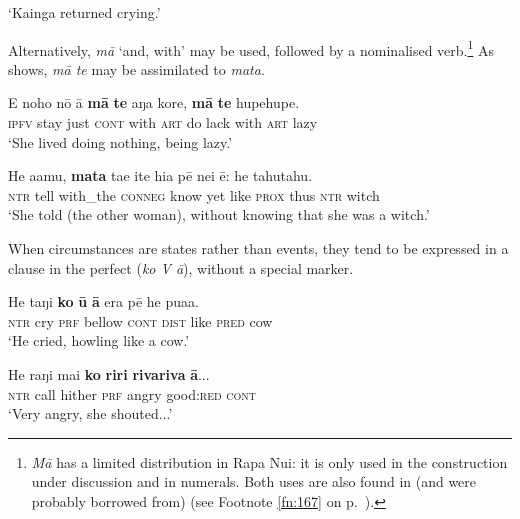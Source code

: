\glt
‘Kainga returned crying.’ \textstyleExampleref{[R243.173]} 
\z

Alternatively, \textit{mā} ‘and, with’ may be used, followed by a nominalised verb.\footnote{\label{fn:538}\textit{Mā} has a limited distribution in Rapa Nui: it is only used in the construction under discussion and in numerals. Both uses are also found in (and were probably borrowed from)  (see Footnote \ref{fn:167} on p.~\pageref{fn:167}).} As  shows, \textit{mā te} may be assimilated to \textit{mata}.

\ea\label{ex:11.272}
\gll E noho nō {\ꞌ}ā \textbf{mā} \textbf{te} aŋa kore, \textbf{mā} \textbf{te} hupehupe. \\
\textsc{ipfv} stay just \textsc{cont} with \textsc{art} do lack with \textsc{art} lazy \\

\glt 
‘She lived doing nothing, being lazy.’ \textstyleExampleref{[R368.016]} 
\z

\ea\label{ex:11.273}
\gll He {\ꞌ}a{\ꞌ}amu, \textbf{mata} ta{\ꞌ}e {\ꞌ}ite hia pē nei ē: he tahutahu. \\
\textsc{ntr} tell with\_the \textsc{conneg} know yet like \textsc{prox} thus \textsc{ntr} witch \\

\glt 
‘She told (the other woman), without knowing that she was a witch.’ \textstyleExampleref{[R532-07.044]}
\z

When circumstances are states rather than events, they tend to be expressed in a clause in the perfect  (\textit{ko V {\ꞌ}ā}), without a special marker. 

\ea\label{ex:11.274}
\gll He taŋi \textbf{ko} \textbf{{\ꞌ}ū} \textbf{{\ꞌ}ā} era pē he pua{\ꞌ}a. \\
\textsc{ntr} cry \textsc{prf} bellow \textsc{cont} \textsc{dist} like \textsc{pred} cow \\

\glt 
‘He cried, howling like a cow.’ \textstyleExampleref{[R210.016]} 
\z

\ea\label{ex:11.275}
\gll He raŋi mai \textbf{ko} \textbf{riri} \textbf{rivariva} \textbf{{\ꞌ}ā}... \\
\textsc{ntr} call hither \textsc{prf} angry good:\textsc{red} \textsc{cont} \\

\glt
‘Very angry, she shouted...’ \textstyleExampleref{[R245.214]} 
\z

